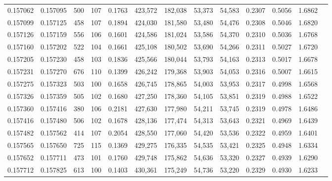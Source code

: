 \begin{tabular}{rrrrrrrrrrrrr}
0.157062 & 0.157095 &   500 & 107 &                                     0.1763 & 423,572 & 182,038 &  53,373 &  54,583 & 0.2307 & 0.5056 & 1.6862 \\
0.157099 & 0.157125 &   458 & 107 &                                     0.1894 & 424,030 & 181,580 &  53,480 &  54,476 & 0.2308 & 0.5046 & 1.6820 \\
0.157126 & 0.157159 &   556 & 106 &                                     0.1601 & 424,586 & 181,024 &  53,586 &  54,370 & 0.2310 & 0.5036 & 1.6768 \\
0.157160 & 0.157202 &   522 & 104 &                                     0.1661 & 425,108 & 180,502 &  53,690 &  54,266 & 0.2311 & 0.5027 & 1.6720 \\
0.157205 & 0.157230 &   458 & 103 &                                     0.1836 & 425,566 & 180,044 &  53,793 &  54,163 & 0.2313 & 0.5017 & 1.6678 \\
0.157231 & 0.157270 &   676 & 110 &                                     0.1399 & 426,242 & 179,368 &  53,903 &  54,053 & 0.2316 & 0.5007 & 1.6615 \\
0.157275 & 0.157323 &   503 & 100 &                                     0.1658 & 426,745 & 178,865 &  54,003 &  53,953 & 0.2317 & 0.4998 & 1.6568 \\
0.157326 & 0.157359 &   505 & 102 &                                     0.1680 & 427,250 & 178,360 &  54,105 &  53,851 & 0.2319 & 0.4988 & 1.6522 \\
0.157360 & 0.157416 &   380 & 106 &                                     0.2181 & 427,630 & 177,980 &  54,211 &  53,745 & 0.2319 & 0.4978 & 1.6486 \\
0.157416 & 0.157480 &   506 & 102 &                                     0.1678 & 428,136 & 177,474 &  54,313 &  53,643 & 0.2321 & 0.4969 & 1.6439 \\
0.157482 & 0.157562 &   414 & 107 &                                     0.2054 & 428,550 & 177,060 &  54,420 &  53,536 & 0.2322 & 0.4959 & 1.6401 \\
0.157565 & 0.157650 &   725 & 115 &                                     0.1369 & 429,275 & 176,335 &  54,535 &  53,421 & 0.2325 & 0.4948 & 1.6334 \\
0.157652 & 0.157711 &   473 & 101 &                                     0.1760 & 429,748 & 175,862 &  54,636 &  53,320 & 0.2327 & 0.4939 & 1.6290 \\
0.157712 & 0.157825 &   613 & 100 &                                     0.1403 & 430,361 & 175,249 &  54,736 &  53,220 & 0.2329 & 0.4930 & 1.6233 \\

\end{tabular}
